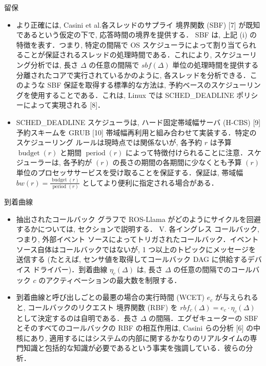 \begin{frame}{留保}
    \begin{itemize}
        \item より正確には, Casini et al.各スレッドのサプライ 境界関数 (SBF) [7] が既知であるという仮定の下で, 応答時間の境界を提供する． SBF は, 上記 (i) の特徴を表す．つまり, 特定の間隔で OS スケジューラによって割り当てられることが保証されるスレッドの処理時間である．これにより, スケジューリング分析では, 長さ $\Delta$ の任意の間隔で $s b f(\Delta)$ 単位の処理時間を提供する分離されたコアで実行されているかのように, 各スレッドを分析できる．このような SBF 保証を取得する標準的な方法は, 予約ベースのスケジューリングを使用することである．これは, Linux では SCHED\_DEADLINE ポリシーによって実現される [8]．
    \end{itemize}
\end{frame}

\begin{frame}{}
    \begin{itemize}
        \item SCHED\_DEADLINE スケジューラは, ハード固定帯域幅サーバ (H-CBS) [9] 予約スキームを GRUB [10] 帯域幅再利用と組み合わせて実装する．特定のスケジューリング ルールは現時点では関係ないが, 各予約 $r$ は予算 $\operatorname{budget}(r)$ と期間 $\operatorname{period}(r)$ によって特徴付けられることに注意．スケジューラーは, 各予約が $(r)$ の長さの期間の各期間に少なくとも予算 $(r)$ 単位のプロセッササービスを受け取ることを保証する．保証は, 帯域幅 $b w(r)=\frac{\operatorname{budget}(r)}{\text { period }(r)}$ としてより便利に指定される場合がある．
    \end{itemize}
\end{frame}

\begin{frame}{到着曲線}
    \begin{itemize}
        \item 抽出されたコールバック グラフで ROS-Llama がどのようにサイクルを回避するかについては, セクションで説明する． V. 各イングレス コールバック, つまり, 外部イベント ソースによってトリガされたコールバック．イベント ソース自体はコールバックではないが, 1 つ以上のトピックにメッセージを送信する (たとえば, センサ値を取得してコールバック DAG に供給するデバイス ドライバー)．到着曲線 $\eta_{c}(\Delta)$ は, 長さ $\Delta$ の任意の間隔でのコールバック $c$ のアクティベーションの最大数を制限する．
    \end{itemize}
\end{frame}

\begin{frame}{}
    \begin{itemize}
        \item 到着曲線と呼び出しごとの最悪の場合の実行時間 (WCET) $e_{c}$ が与えられると, コールバックのリクエスト 境界関数 (RBF) を $r b f_{c}(\Delta)=e_{c} \cdot \eta_{c}(\Delta)$ として決定するのは自明である．長さ $\Delta$ の間隔．エグゼキューターの SBF とそのすべてのコールバックの RBF の相互作用は, Casini らの分析 [6] の中核にあり, 適用するにはシステムの内部に関するかなりのリアルタイムの専門知識と包括的な知識が必要であるという事実を強調している．彼らの分析．
    \end{itemize}
\end{frame}
